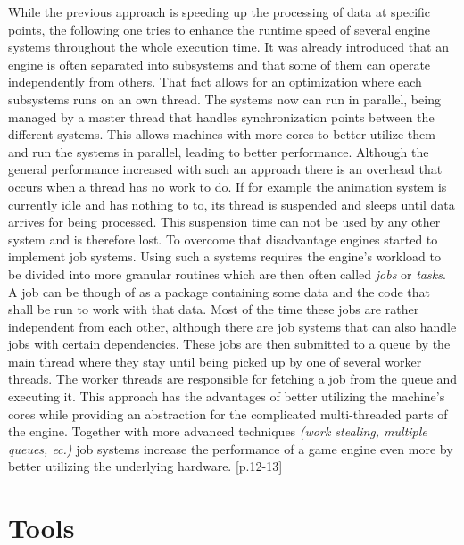 While the previous approach is speeding up the processing of data at specific points, the following one tries to enhance the runtime speed of several engine systems throughout the whole execution time. It was already introduced that an engine is often separated into subsystems and that some of them can operate independently from others. That fact allows for an optimization where each subsystems runs on an own thread. The systems now can run in parallel, being managed by a master thread that handles synchronization points between the different systems. This allows machines with more cores to better utilize them and run the systems in parallel, leading to better performance. Although the general performance increased with such an approach there is an overhead that occurs when a thread has no work to do. If for example the animation system is currently idle and has nothing to to, its thread is suspended and sleeps until data arrives for being processed. This suspension time can not be used by any other system and is therefore lost.
To overcome that disadvantage engines started to implement job systems. Using such a systems requires the engine's workload to be divided into more granular routines which are then often called \textit{jobs} or \textit{tasks}. A job can be though of as a package containing some data and the code that shall be run to work with that data. Most of the time these jobs are rather independent from each other, although there are job systems that can also handle jobs with certain dependencies. These jobs are then submitted to a queue by the main thread where they stay until being picked up by one of several worker threads. The worker threads are responsible for fetching a job from the queue and executing it. This approach has the advantages of better utilizing the machine's cores while providing an abstraction for the complicated multi-threaded parts of the engine. Together with more advanced techniques \textit{(work stealing, multiple queues, ec.)} job systems increase the performance of a game engine even more by better utilizing the underlying hardware. \cite{Portisch17}[p.12-13]

\section{Tools}

